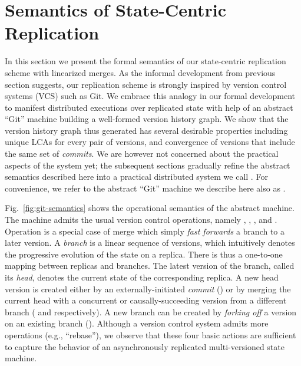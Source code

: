 \section{Semantics of State-Centric Replication}
\label{sec:abstract-sem}



In this section we present the formal semantics of our state-centric
replication scheme with linearized merges. As the informal development
from previous section suggests, our replication scheme is strongly
inspired by version control systems (VCS) such as Git.  We
embrace this analogy in our formal development to manifest distributed
executions over replicated state with help of an abstract ``Git''
machine building a well-formed version history graph.  We show that
the version history graph thus generated has several desirable
properties including unique LCAs for every pair of versions, and
convergence of versions that include the same set of \emph{commits}.
We are however not concerned about the practical aspects of the system
yet; the subsequent sections gradually refine the abstract semantics
described here into a practical distributed system we call \quark. For
convenience, we refer to the abstract ``Git'' machine we describe here
also as \quark.

Fig.~\ref{fig:git-semantics} shows the operational semantics of the
\quark abstract machine. The machine admits the usual version control
operations, namely , ,
, and . Operation
 is a special case of merge which simply \emph{fast
forwards} a branch to a later version. A \emph{branch} is a linear
sequence of versions, which intuitively denotes the progressive
evolution of the state on a replica. There is thus a one-to-one
mapping between replicas and branches. The latest version of the
branch, called its \emph{head}, denotes the current state of the
corresponding replica. A new head version is created either by an
externally-initiated \emph{commit} () or by merging
the current head with a concurrent or causally-succeeding version from
a different branch ( and 
respectively). A new branch can be created by \emph{forking off} a
version on an existing branch (). Although a version
control system admits more operations (e.g., ``rebase''), we observe
that these four basic actions are sufficient to capture the behavior
of an asynchronously replicated multi-versioned state machine.

